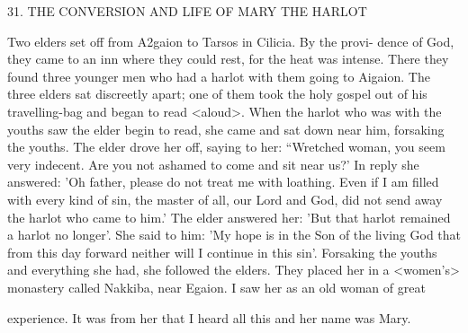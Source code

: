 31. THE CONVERSION AND LIFE
OF MARY THE HARLOT

Two elders set off from A2gaion to Tarsos in Cilicia. By the provi-
dence of God, they came to an inn where they could rest, for the
heat was intense. There they found three younger men who had a
harlot with them going to Aigaion. The three elders sat discreetly
apart; one of them took the holy gospel out of his travelling-bag
and began to read <aloud>. When the harlot who was with the
youths saw the elder begin to read, she came and sat down near
him, forsaking the youths. The elder drove her off, saying to her:
“Wretched woman, you seem very indecent. Are you not ashamed
to come and sit near us?' In reply she answered: 'Oh father, please
do not treat me with loathing. Even if I am filled with every kind of
sin, the master of all, our Lord and God, did not send away the
harlot who came to him.' The elder answered her: 'But that harlot
remained a harlot no longer'. She said to him: 'My hope is in the
Son of the living God that from this day forward neither will I
continue in this sin'. Forsaking the youths and everything she had,
she followed the elders. They placed her in a <women's> monastery
called Nakkiba, near Egaion. I saw her as an old woman of great

experience. It was from her that I heard all this and her name was
Mary.

